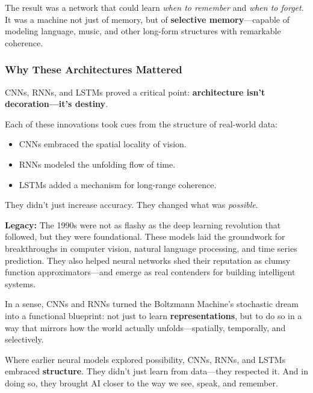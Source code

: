 The result was a network that could learn \emph{when to remember} and \emph{when to forget}. It was a machine not just of memory, but of \textbf{selective memory}—capable of modeling language, music, and other long-form structures with remarkable coherence.

\subsubsection{Why These Architectures Mattered}

CNNs, RNNs, and LSTMs proved a critical point: \textbf{architecture isn’t decoration—it’s destiny}.

Each of these innovations took cues from the structure of real-world data:
\begin{itemize}
  \item CNNs embraced the spatial locality of vision.
  \item RNNs modeled the unfolding flow of time.
  \item LSTMs added a mechanism for long-range coherence.
\end{itemize}

They didn’t just increase accuracy. They changed what was \emph{possible}.

\medskip

\noindent\textbf{Legacy:} The 1990s were not as flashy as the deep learning revolution that followed, but they were foundational. These models laid the groundwork for breakthroughs in computer vision, natural language processing, and time series prediction. They also helped neural networks shed their reputation as clumsy function approximators—and emerge as real contenders for building intelligent systems.

In a sense, CNNs and RNNs turned the Boltzmann Machine’s stochastic dream into a functional blueprint: not just to learn \textbf{representations}, but to do so in a way that mirrors how the world actually unfolds—spatially, temporally, and selectively.

\begin{tcolorbox}[colback=blue!5!white, colframe=blue!50!black, title={Architectures With Intuition}]
Where earlier neural models explored possibility,  
CNNs, RNNs, and LSTMs embraced \textbf{structure}.  
They didn’t just learn from data—they respected it.  
And in doing so, they brought AI closer to the way we see, speak, and remember.
\end{tcolorbox}
